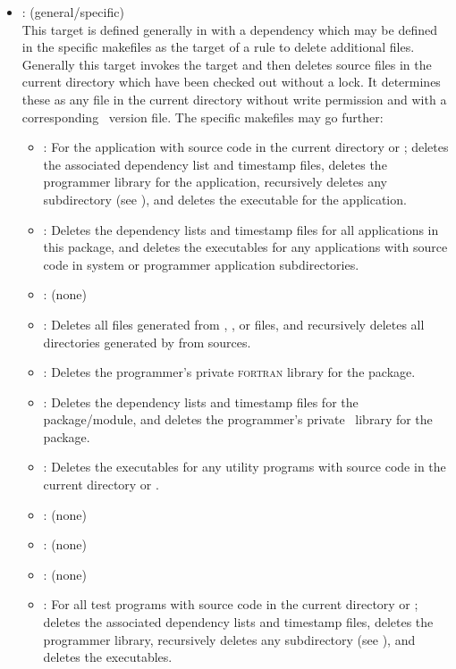\begin{itemize}
\item
    : (general/specific)
   \\ This target is defined generally in  with a dependency
   which may be defined in the specific makefiles as the target of a rule to
   delete additional files.  Generally this target invokes the 
   target and then deletes source files in the current directory which have
   been checked out without a lock.  It determines these as any file in the
   current directory without write permission and with a corresponding
   \rcs\ version file.  The specific makefiles may go further:
   \begin{itemize}
   \item
      : For the application with source code in the current
      directory or ; deletes the associated dependency list
      and timestamp files, deletes the programmer library for the application,
      recursively deletes any  subdirectory (see
      ), and deletes the executable for the application.
   \item
      : Deletes the dependency lists and timestamp files for all
      applications in this package, and deletes the executables for any
      applications with source code in system or programmer application
      subdirectories.
   \item
      : (none)
   \item
      : Deletes all  files generated from ,
      , or  files, and recursively deletes all
      directories generated by  from 
      sources.
   \item
      : Deletes the programmer's private \textsc{fortran} library
      for the package.
   \item
      : Deletes the dependency lists and timestamp files for the
      package/module, and deletes the programmer's private \cplusplus\ library
      for the package.
   \item
      : Deletes the executables for any utility programs with source
      code in the current directory or .
   \item
      : (none)
   \item
      : (none)
   \item
      : (none)
   \item
      : For all test programs with source code in the current
      directory or ; deletes the associated dependency lists
      and timestamp files, deletes the programmer library, recursively deletes
      any  subdirectory (see ), and deletes the
      executables.
   \end{itemize}


\end{itemize}
